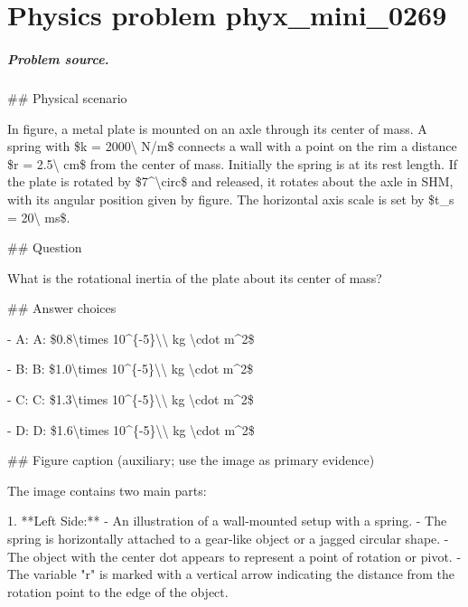 
\chapter{Physics problem phyx\_mini\_0269}
\label{ch:PhyXMiniProblems_problem_phyx_mini_0269}

\paragraph{Problem source.}
\#\# Physical scenario

In figure, a metal plate is mounted on an axle through its center of mass. A spring with \$k = 2000\textbackslash{} N/m\$ connects a wall with a point on the rim a distance \$r = 2.5\textbackslash{} cm\$ from the center of mass. Initially the spring is at its rest length. If the plate is rotated by \$7\textasciicircum{}\textbackslash{}circ\$ and released, it rotates about the axle in SHM, with its angular position given by figure. The horizontal axis scale is set by \$t\_s = 20\textbackslash{} ms\$.

\#\# Question

What is the rotational inertia of the plate about its center of mass?

\#\# Answer choices

- A: A: \$0.8\textbackslash{}times 10\textasciicircum{}\{-5\}\textbackslash{}\textbackslash{} kg \textbackslash{}cdot m\textasciicircum{}2\$

- B: B: \$1.0\textbackslash{}times 10\textasciicircum{}\{-5\}\textbackslash{}\textbackslash{} kg \textbackslash{}cdot m\textasciicircum{}2\$

- C: C: \$1.3\textbackslash{}times 10\textasciicircum{}\{-5\}\textbackslash{}\textbackslash{} kg \textbackslash{}cdot m\textasciicircum{}2\$

- D: D: \$1.6\textbackslash{}times 10\textasciicircum{}\{-5\}\textbackslash{}\textbackslash{} kg \textbackslash{}cdot m\textasciicircum{}2\$

\#\# Figure caption (auxiliary; use the image as primary evidence)

The image contains two main parts:

1. **Left Side:**
   - An illustration of a wall-mounted setup with a spring.
   - The spring is horizontally attached to a gear-like object or a jagged circular shape.
   - The object with the center dot appears to represent a point of rotation or pivot.
   - The variable "r" is marked with a vertical arrow indicating the distance from the rotation point to the edge of the object.

